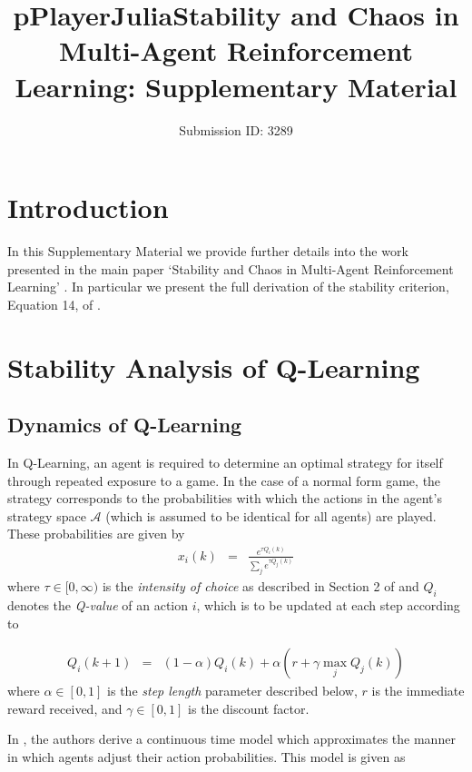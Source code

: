 \documentclass{article}
\title{pPlayerJulia}
\title{Stability and Chaos in Multi-Agent Reinforcement Learning: Supplementary Material}
\author{\large{Submission ID: 3289}}
\date{}
\begin{document}
\maketitle

\section{Introduction}

In this Supplementary Material we provide further details into the work presented in the main paper `Stability and Chaos in Multi-Agent Reinforcement Learning' \cite{MainPaper}. In particular we present the full derivation of the stability criterion, Equation 14, of \cite{MainPaper}.

\section{Stability Analysis of Q-Learning} %

\subsection{Dynamics of Q-Learning}

In Q-Learning, an agent is required to determine an optimal strategy for itself through repeated exposure to a game. In the case of a normal form game, the strategy corresponds to the probabilities with which the actions in the agent's strategy space $\mathcal{A}$ (which is assumed to be identical for all agents) are played. These probabilities are given by
%
\begin{eqnarray*}
    x_i(k) & = & \frac{e^{\tau Q_i(k)}}{\sum_j e^{\tau Q_j(k)}}
\end{eqnarray*}
%
where $\tau \in [0, \infty)$ is the \textit{intensity of choice} as described in Section 2 of \cite{MainPaper} and $Q_i$ denotes the \textit{Q-value} of an action $i$, which is to be updated at each step according to

\begin{eqnarray}
\label{eqn::Qupdate}
    Q_i(k+1) & = & (1 - \alpha) Q_i(k) + \alpha (r + \gamma \max_j Q_j(k))
\end{eqnarray}
%
where $\alpha \in [0, 1]$ is the \textit{step length} parameter described below, $r$ is the immediate reward received, and $\gamma \in [0, 1]$ is the discount factor.

In \cite{Tuyls2006AnGames}, the authors derive a continuous time model which approximates the manner in which agents adjust their action probabilities. This model is given as
\end{document}

